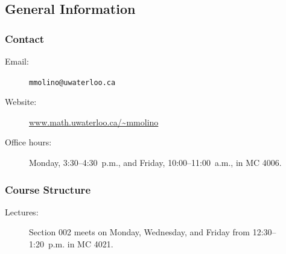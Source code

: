 
\subsection{General Information}

\subsubsection{Contact}
\begin{description}
    \item[Email:] \texttt{mmolino@uwaterloo.ca}
    \item[Website:] \url{www.math.uwaterloo.ca/~mmolino}
    \item[Office hours:] Monday, 3:30--4:30~p.m., and Friday, 10:00--11:00~a.m., in MC 4006.
\end{description}

\subsubsection{Course Structure}
\begin{description}
    \item[Lectures:] Section 002 meets on Monday, Wednesday, and Friday from 12:30--1:20~p.m. in MC 4021.
\end{description}

